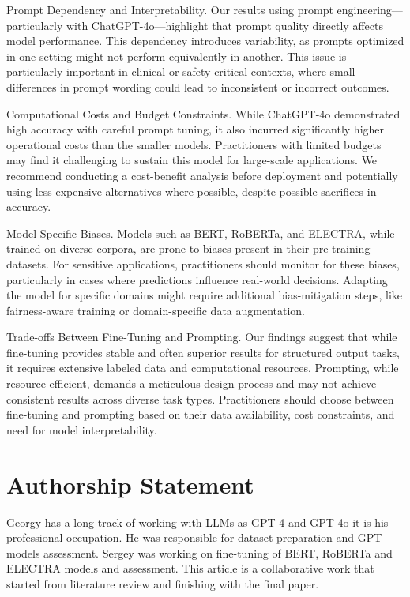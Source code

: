 \documentclass[11pt]{article}
\begin{document}
Prompt Dependency and Interpretability. Our results using prompt engineering—particularly with ChatGPT-4o—highlight that prompt quality directly affects model performance. This dependency introduces variability, as prompts optimized in one setting might not perform equivalently in another. This issue is particularly important in clinical or safety-critical contexts, where small differences in prompt wording could lead to inconsistent or incorrect outcomes.

Computational Costs and Budget Constraints. While ChatGPT-4o demonstrated high accuracy with careful prompt tuning, it also incurred significantly higher operational costs than the smaller models. Practitioners with limited budgets may find it challenging to sustain this model for large-scale applications. We recommend conducting a cost-benefit analysis before deployment and potentially using less expensive alternatives where possible, despite possible sacrifices in accuracy.

Model-Specific Biases. Models such as BERT, RoBERTa, and ELECTRA, while trained on diverse corpora, are prone to biases present in their pre-training datasets. For sensitive applications, practitioners should monitor for these biases, particularly in cases where predictions influence real-world decisions. Adapting the model for specific domains might require additional bias-mitigation steps, like fairness-aware training or domain-specific data augmentation.

Trade-offs Between Fine-Tuning and Prompting. Our findings suggest that while fine-tuning provides stable and often superior results for structured output tasks, it requires extensive labeled data and computational resources. Prompting, while resource-efficient, demands a meticulous design process and may not achieve consistent results across diverse task types. Practitioners should choose between fine-tuning and prompting based on their data availability, cost constraints, and need for model interpretability.

\section*{Authorship Statement}

Georgy has a long track of working with LLMs as GPT-4 and GPT-4o it is his professional occupation. He was responsible for dataset preparation and GPT models assessment. Sergey was working on fine-tuning of BERT, RoBERTa and ELECTRA models and assessment. This article is a collaborative work that started from literature review and finishing with the final paper.
\end{document}
